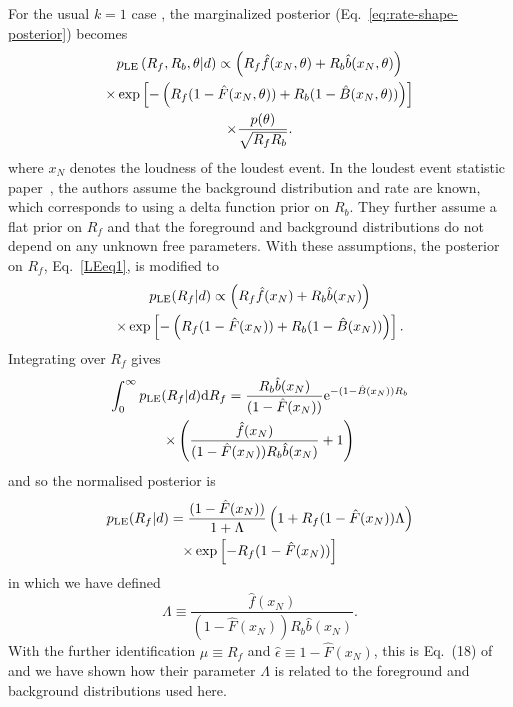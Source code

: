 \documentclass[aps,prd,reprint,nofootinbib]{revtex4-1}
\begin{document}
For the usual $k=1$ case \citep{Biswas2009}, the marginalized
posterior (Eq.~\eqref{eq:rate-shape-posterior}) becomes
\begin{multline}\label{LEeq1}
p_{\rm LE}\left( R_f, R_b, \theta | d \right) \propto \left(R_f
\hat{f}(x_N,\theta) + R_b \hat{b}(x_N,\theta)\right) \\ \times \exp\left[-\left(
  R_f (1-\hat{F}(x_N,\theta)) + R_b (1-\hat{B}(x_N,\theta)) \right)
  \right] \\ \times \frac{p(\theta)}{\sqrt{R_f R_b}}.
\end{multline}
where $x_N$ denotes the loudness of the loudest event. In the loudest event statistic paper~\citep{Biswas2009}, the authors assume the background distribution and rate are known, which corresponds to using a delta function prior on $R_b$. They further assume a flat prior on $R_f$ and that the foreground and background distributions do not depend on any unknown free parameters. With these assumptions, the posterior on $R_f$, Eq.~\eqref{LEeq1}, is modified to
\begin{multline}
p_{\rm LE}(R_f|d) \propto  \left(R_f
\hat{f}(x_N) + R_b \hat{b}(x_N)\right) \\ \times \exp\left[-\left(
  R_f (1-\hat{F}(x_N)) + R_b (1-\hat{B}(x_N)) \right)
  \right] .
\end{multline}
Integrating over $R_f$ gives
\begin{multline}
\int_0^\infty p_{\rm LE}(R_f|d) {\rm d}R_f =  \frac{R_b \hat{b}(x_N)}{(1-\hat{F}(x_N))} {\rm e}^{-(1-\hat{B}(x_N)) R_b}\\
\times \left(\frac{\hat{f}(x_N)}{(1-\hat{F}(x_N)) R_b \hat{b}(x_N)} + 1 \right)
\end{multline}
and so the normalised posterior is
\begin{multline}
p_{\rm LE}(R_f|d) = \frac{(1-\hat{F}(x_N))}{1+\Lambda} \left( 1+ R_f (1-\hat{F}(x_N))\Lambda \right) \\
\times \exp\left[-R_f (1-\hat{F}(x_N))\right]
\end{multline}
in which we have defined
\begin{equation}
\Lambda \equiv \frac{\hat{f}(x_N)}{(1-\hat{F}(x_N)) R_b \hat{b}(x_N)}.
\end{equation}
With the further identification $\mu \equiv R_f$ and $\hat{\epsilon} \equiv 1 - \hat{F}(x_N)$, this is Eq.~(18) of~\citep{Biswas2009} and we have shown how their parameter $\Lambda$ is related to the foreground and background distributions used here.
\end{document}
